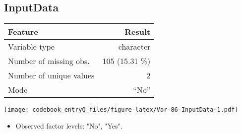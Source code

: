\documentclass[]{article}
\providecommand{\tightlist}{%
  \setlength{\itemsep}{0pt}\setlength{\parskip}{0pt}}
\newcommand{\fullline}{\noindent\makebox[\linewidth]{\rule{\textwidth}{0.4pt}}}
\newcommand{\bminione}{\begin{minipage}{0.75 \textwidth}}
\newcommand{\bminitwo}{\begin{minipage}{0.25 \textwidth}}
\newcommand{\emini}{\end{minipage}}
\begin{document}
\fullline

\hypertarget{inputdata}{\subsection{InputData}\label{inputdata}}

\bminione

\begin{longtable}[]{@{}lr@{}}
\toprule
\begin{minipage}[b]{0.34\columnwidth}\raggedright\strut
Feature\strut
\end{minipage} & \begin{minipage}[b]{0.20\columnwidth}\raggedleft\strut
Result\strut
\end{minipage}\tabularnewline
\midrule
\endhead
\begin{minipage}[t]{0.34\columnwidth}\raggedright\strut
Variable type\strut
\end{minipage} & \begin{minipage}[t]{0.20\columnwidth}\raggedleft\strut
character\strut
\end{minipage}\tabularnewline
\begin{minipage}[t]{0.34\columnwidth}\raggedright\strut
Number of missing obs.\strut
\end{minipage} & \begin{minipage}[t]{0.20\columnwidth}\raggedleft\strut
105 (15.31 \%)\strut
\end{minipage}\tabularnewline
\begin{minipage}[t]{0.34\columnwidth}\raggedright\strut
Number of unique values\strut
\end{minipage} & \begin{minipage}[t]{0.20\columnwidth}\raggedleft\strut
2\strut
\end{minipage}\tabularnewline
\begin{minipage}[t]{0.34\columnwidth}\raggedright\strut
Mode\strut
\end{minipage} & \begin{minipage}[t]{0.20\columnwidth}\raggedleft\strut
``No''\strut
\end{minipage}\tabularnewline
\bottomrule
\end{longtable}

\emini
\bminitwo
\texttt{[image: codebook\_entryQ\_files/figure-latex/Var-86-InputData-1.pdf]}
\emini

\begin{itemize}
\tightlist
\item
  Observed factor levels: "No", "Yes".
\end{itemize}
\end{document}
